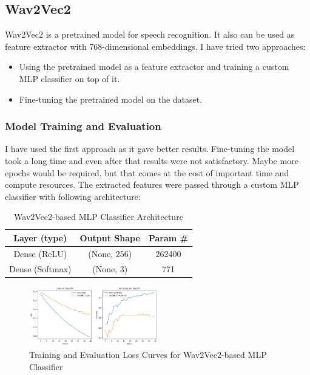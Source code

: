 \documentclass[conference]{IEEEtran}
\begin{document}
\subsection{Wav2Vec2}
Wav2Vec2\cite{wav2vec2} is a pretrained model for speech recognition. It also can be used as feature extractor with 768-dimensional embeddings. I have tried two approaches:
\begin{itemize}
    \item Using the pretrained model as a feature extractor and training a custom MLP classifier on top of it.
    \item Fine-tuning the pretrained model on the dataset.
\end{itemize}

\subsubsection*{Model Training and Evaluation}
I have used the first approach as it gave better results. Fine-tuning the model took a long time and even after that results were not satisfactory. Maybe more epochs would be required, but that comes at the cost of important time and compute resources.
The extracted features were passed through a custom MLP classifier with following architecture:
\begin{table}[htbp]
\caption{Wav2Vec2-based MLP Classifier Architecture}
\begin{center}
\begin{tabular}{|c|c|c|}
\hline
\textbf{Layer (type)} & \textbf{Output Shape} & \textbf{Param \#} \\
\hline
Dense (ReLU) & (None, 256) & 262400 \\
\hline
Dense (Softmax) & (None, 3) & 771 \\
\hline
\end{tabular}
\label{tab:wav2vec2_mlp}
\end{center}
\end{table}

\begin{figure}[htbp]
\centerline{\includegraphics[width=0.5\textwidth]{wav2vec2_training_eval_loss.png}}
\caption{Training and Evaluation Loss Curves for Wav2Vec2-based MLP Classifier}
\label{fig:wav2vec2_loss_curves}
\end{figure}
\end{document}
